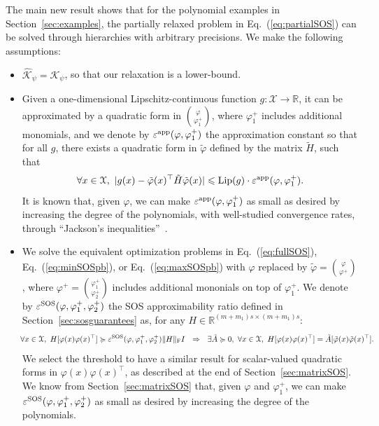 \documentclass[11pt]{article}
\newcommand{\BIT}{\begin{itemize}}
\newcommand{\EIT}{\end{itemize}}
\newcommand{\idm}{I}
\newcommand{\rb}{\mathbb{R}}
\newcommand{\mysec}[1]{Section~\ref{sec:#1}}
\newcommand{\eq}[1]{Eq.~(\ref{eq:#1})}
\def \X{{\mathcal X}}
\def \K{{\mathcal K}}
\begin{document}
The main new result shows that for the polynomial examples in \mysec{examples}, the partially relaxed problem in \eq{partialSOS} can be solved through hierarchies with arbitrary precisions. We make the following assumptions:
\BIT
\item[\textbf{(A1)}] $\widehat{\K}_\psi = \K_\psi$, so that our relaxation is a lower-bound.
\item[\textbf{(A2)}] Given a one-dimensional Lipschitz-continuous function $g: \X \to \rb$, it can be approximated by a quadratic form in 
$  { \varphi \choose \varphi_1^+  } $, where $\varphi_1^+$ includes additional monomials, and we denote by $\varepsilon^{{\rm app}}(\varphi,\varphi_1^+)$ the approximation constant so that for all $g$, there exists a quadratic form in $\tilde{\varphi} $ defined by the matrix $\tilde{H}$, such that
\[
\forall x \in \X, \ | g(x) - \tilde{\varphi}(x)^\top \tilde{H}  \tilde{\varphi}(x) | \leqslant {\rm Lip}(g) \cdot \varepsilon^{{\rm app}}(\varphi,\varphi^+_1).
\]
It is known that, given $\varphi$, we can make $\varepsilon^{{\rm app}}(\varphi,\varphi^+_1)$ as small as desired by increasing the degree of the polynomials, with well-studied convergence rates, through ``Jackson's inequalities''~\cite{ganzburg1981multidimensional}.

\item[\textbf{(A3)}] We solve the equivalent optimization problems in \eq{fullSOS}, \eq{minSOSpb}, or \eq{maxSOSpb} with $\varphi$ replaced by $\tilde{\varphi} = { \varphi \choose \varphi^+  } $, where $\varphi^+ = { \varphi_1^+ \choose \varphi_2^+}$ includes additional mononials on top of $\varphi_1^+$. We denote by $\varepsilon^{\rm SOS}(\varphi,\varphi^+_1,\varphi_2^+)$ the SOS approximability ratio defined in \mysec{sosguarantees} as, for any $H \in \rb^{(m+m_1)s \times (m+m_1)s}$:
\[
\!\! \forall x \in \X, \ H[ \varphi(x) \varphi(x)^\top] \succcurlyeq  \varepsilon^{\rm SOS}(\varphi,\varphi^+_1,\varphi_2^+)  \| H \|_{\rm F}\idm \ \ \Rightarrow \ \ \exists \tilde{A} \succcurlyeq 0, \ \forall x \in \X, \  H[ \varphi(x) \varphi(x)^\top] = 
 \tilde{A}[ \tilde{\varphi}(x) \tilde{\varphi}(x)^\top].
\]
We select the threshold to have a similar result for scalar-valued quadratic forms in $\varphi(x)\varphi(x)^\top$, as described at the end of \mysec{matrixSOS}.
We know from \mysec{matrixSOS} that, given $\varphi$ and $\varphi^+_1$, we can make $\varepsilon^{\rm SOS}(\varphi,\varphi^+_1,\varphi_2^+)$ as small as desired by increasing the degree of the polynomials.  \EIT 
\end{document}
